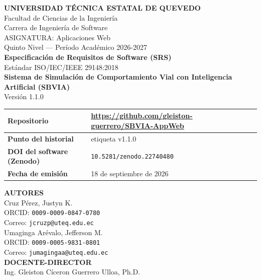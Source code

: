 \documentclass[11pt,a4paper]{article}
\begin{document}
\begin{titlepage}
    \centering
    \vspace*{1cm}
    {\LARGE \textbf{UNIVERSIDAD TÉCNICA ESTATAL DE QUEVEDO}}\\[0.5cm]
    {\large Facultad de Ciencias de la Ingeniería}\\[0.2cm]
    {\large Carrera de Ingeniería de Software}\\[0.8cm]
    
    {\large ASIGNATURA: Aplicaciones Web}\\[0.2cm]
    {\large Quinto Nivel — Período Académico 2026-2027}\\[1cm]
    
    {\Huge \bfseries Especificación de Requisitos de Software (SRS)}\\[0.5cm]
    {\large Estándar ISO/IEC/IEEE 29148:2018}\\[1cm]
    
    {\huge \bfseries \color{uteqblue} Sistema de Simulación de Comportamiento Vial con Inteligencia Artificial (SBVIA)}\\[0.5cm]
    {\Large Versión 1.1.0}\\[1cm]
    
    \begin{table}[h]
        \centering
        \renewcommand{\arraystretch}{1.5}
        \begin{tabularx}{\textwidth}{|l|X|}
            \hline
            \textbf{Repositorio} & \url{https://github.com/gleiston-guerrero/SBVIA-AppWeb} \\ \hline
            \textbf{Punto del historial} & etiqueta v1.1.0 \\ \hline
            \textbf{DOI del software (Zenodo)} & \texttt{10.5281/zenodo.22740480} \\ \hline
            \textbf{Fecha de emisión} & 18 de septiembre de 2026 \\ \hline
        \end{tabularx}
    \end{table}

    \vfill

    {\Large \textbf{AUTORES}}\\[0.2cm]
    {\large Cruz Pérez, Justyn K.}\\[0.1cm]
    {\normalsize ORCID: \texttt{0009-0009-0847-0780}}\\[0.1cm]
    {\normalsize Correo: \texttt{jcruzp@uteq.edu.ec}}\\[0.5cm]

    {\large Umaginga Arévalo, Jefferson M.}\\[0.1cm]
    {\normalsize ORCID: \texttt{0009-0005-9831-0801}}\\[0.1cm]
    {\normalsize Correo: \texttt{jumagingaa@uteq.edu.ec}}\\[0.5cm]

    {\Large \textbf{DOCENTE-DIRECTOR}}\\[0.2cm]
    {\large Ing. Gleiston Cíceron Guerrero Ulloa, Ph.D.}\\[0.5cm]
    
\end{titlepage}
\end{document}
